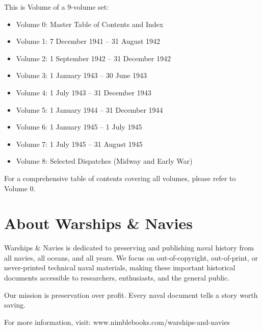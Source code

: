 \documentclass[11pt]{book}
\newcommand{\includegraypage}[2]{
    \newpage
    \thispagestyle{empty}
    \vspace*{\fill}
    \begin{center}
        \texttt{[image: \#2]}
    \end{center}
    \vfill
}
\begin{document}
This is Volume  of a 9-volume set:
\begin{itemize}
    \item Volume 0: Master Table of Contents and Index
    \item Volume 1: 7 December 1941 -- 31 August 1942
    \item Volume 2: 1 September 1942 -- 31 December 1942
    \item Volume 3: 1 January 1943 -- 30 June 1943
    \item Volume 4: 1 July 1943 -- 31 December 1943
    \item Volume 5: 1 January 1944 -- 31 December 1944
    \item Volume 6: 1 January 1945 -- 1 July 1945
    \item Volume 7: 1 July 1945 -- 31 August 1945
    \item Volume 8: Selected Dispatches (Midway and Early War)
\end{itemize}

\vspace{0.2in}

For a comprehensive table of contents covering all volumes, please refer to Volume 0.

\tableofcontents

\mainmatter
\pagestyle{maincontent}



\backmatter

\chapter*{About Warships \& Navies}

Warships \& Navies is dedicated to preserving and publishing naval history from all navies, all oceans, and all years. We focus on out-of-copyright, out-of-print, or never-printed technical naval materials, making these important historical documents accessible to researchers, enthusiasts, and the general public.

\vspace{0.2in}

Our mission is preservation over profit. Every naval document tells a story worth saving.

\vspace{0.2in}

\noindent
For more information, visit: www.nimblebooks.com/warships-and-navies
\end{document}
